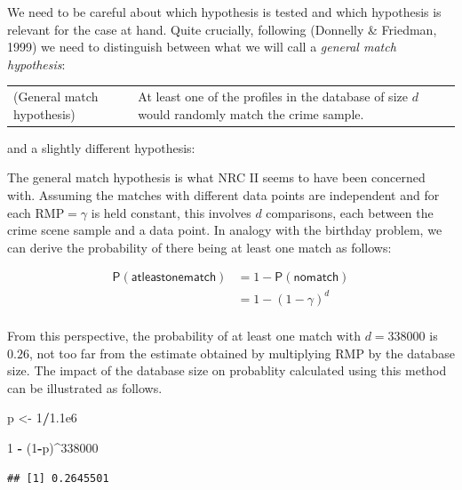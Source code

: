 \documentclass[10pt,dvipsnames,enabledeprecatedfontcommands]{scrartcl}
\newenvironment{Shaded}{\begin{snugshade}}{\end{snugshade}}
\newcommand{\DecValTok}[1]{\textcolor[rgb]{0.00,0.00,0.81}{#1}}
\newcommand{\FloatTok}[1]{\textcolor[rgb]{0.00,0.00,0.81}{#1}}
\newcommand{\StringTok}[1]{\textcolor[rgb]{0.31,0.60,0.02}{#1}}
\newcommand{\OperatorTok}[1]{\textcolor[rgb]{0.81,0.36,0.00}{\textbf{#1}}}
\newcommand{\NormalTok}[1]{#1}
\newcommand{\pr}[1]{\mathsf{P}(#1)}
\begin{document}
We need to be careful about which hypothesis is tested and which
hypothesis is relevant for the case at hand. Quite crucially, following
(Donnelly \& Friedman, 1999) we need to distinguish between what we will
call a \emph{general match hypothesis}:

\begin{tabular}{lp{8cm}}
(General match hypothesis) &
At least one of the profiles in the database of size $d$ 
would randomly match the crime sample.
\end{tabular}

and a slightly different hypothesis:

The general match hypothesis is what NRC II seems to have been concerned
with. Assuming the matches with different data points are independent
and for each RMP\(=\gamma\) is held constant, this involves \(d\)
comparisons, each between the crime scene sample and a data point. In
analogy with the birthday problem, we can
derive the probability of there being at least one match as follows:

\begin{align}
\pr{\mathsf{at least one match}} & = 1 - \pr{\mathsf{no match}}\\
& = 1 - (1 - \gamma)^d\\
\end{align}

From this perspective, the probability of at least one match with
\(d=338000\) is \(0.26\), not too far from the estimate obtained by
multiplying RMP by the database size. The impact of the database size on
probablity calculated using this method can be illustrated as follows.


\begin{Shaded}
\begin{Highlighting}[]
\NormalTok{p <-}\StringTok{ }\DecValTok{1}\OperatorTok{/}\FloatTok{1.1e6}

\DecValTok{1} \OperatorTok{-}\StringTok{ }\NormalTok{(}\DecValTok{1}\OperatorTok{-}\NormalTok{p)}\OperatorTok{^}\DecValTok{338000}
\end{Highlighting}
\end{Shaded}

\begin{verbatim}
## [1] 0.2645501
\end{verbatim}
\end{document}
